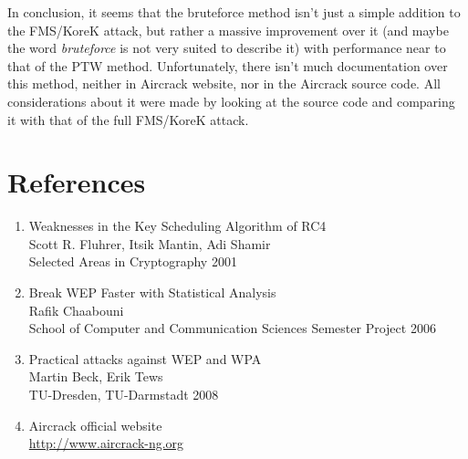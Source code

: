 \documentclass[a4paper,12pt,titlepage]{article}
\begin{document}
In conclusion, it seems that the bruteforce method isn't just a simple addition
to the FMS/KoreK attack, but rather a massive improvement over it (and maybe
the word \emph{bruteforce} is not very suited to describe it) with performance near
to that of the PTW method. Unfortunately, there
isn't much documentation over this method, neither in Aircrack website, nor in
the Aircrack source code. All considerations about it were made by looking at
the source code and comparing it with that of the full FMS/KoreK attack.

\section{References}
  \begin{enumerate}
    \item Weaknesses in the Key Scheduling Algorithm of RC4 \\
          Scott R. Fluhrer, Itsik Mantin, Adi Shamir \\
          Selected Areas in Cryptography 2001
    \item Break WEP Faster with Statistical Analysis \\
          Rafik Chaabouni \\
          School of Computer and Communication Sciences Semester Project 2006
    \item Practical attacks against WEP and WPA \\
          Martin Beck, Erik Tews \\
          TU-Dresden, TU-Darmstadt 2008
    \item Aircrack official website \\
          \url{http://www.aircrack-ng.org}
  \end{enumerate}
\end{document}
